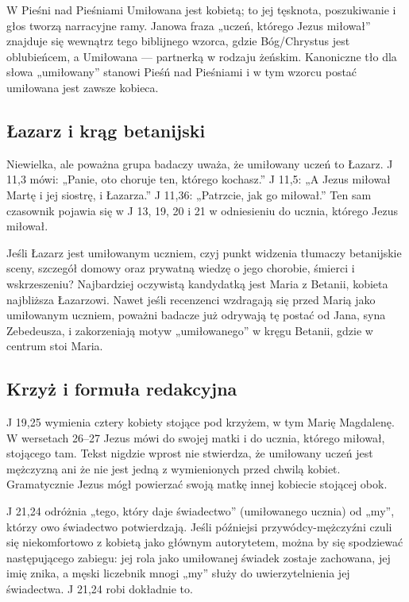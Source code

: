 W Pieśni nad Pieśniami Umiłowana jest kobietą; to jej tęsknota, poszukiwanie i głos tworzą narracyjne ramy.
Janowa fraza „uczeń, którego Jezus miłował” znajduje się wewnątrz tego biblijnego wzorca, gdzie Bóg/Chrystus jest oblubieńcem, a Umiłowana — partnerką w rodzaju żeńskim.
Kanoniczne tło dla słowa „umiłowany” stanowi Pieśń nad Pieśniami i w tym wzorcu postać umiłowana jest zawsze kobieca.

\subsection{Łazarz i krąg betanijski}\label{subsec:lazarus-bethany}

Niewielka, ale poważna grupa badaczy uważa, że umiłowany uczeń to Łazarz.
J 11,3 mówi: „Panie, oto choruje ten, którego kochasz.”
J 11,5: „A Jezus miłował Martę i jej siostrę, i Łazarza.”
J 11,36: „Patrzcie, jak go miłował.”
Ten sam czasownik pojawia się w J 13, 19, 20 i 21 w odniesieniu do ucznia, którego Jezus miłował.

Jeśli Łazarz jest umiłowanym uczniem, czyj punkt widzenia tłumaczy betanijskie sceny, szczegół domowy oraz prywatną wiedzę o jego chorobie, śmierci i wskrzeszeniu?
Najbardziej oczywistą kandydatką jest Maria z Betanii, kobieta najbliższa Łazarzowi.
Nawet jeśli recenzenci wzdragają się przed Marią jako umiłowanym uczniem, poważni badacze już odrywają tę postać od Jana, syna Zebedeusza, i zakorzeniają motyw „umiłowanego” w kręgu Betanii, gdzie w centrum stoi Maria.

\subsection{Krzyż i formuła redakcyjna}\label{subsec:cross-editorial-formula}

J 19,25 wymienia cztery kobiety stojące pod krzyżem, w tym Marię Magdalenę.
W wersetach 26--27 Jezus mówi do swojej matki i do ucznia, którego miłował, stojącego tam.
Tekst nigdzie wprost nie stwierdza, że umiłowany uczeń jest mężczyzną ani że nie jest jedną z wymienionych przed chwilą kobiet.
Gramatycznie Jezus mógł powierzać swoją matkę innej kobiecie stojącej obok.

J 21,24 odróżnia „tego, który daje świadectwo” (umiłowanego ucznia) od „my”, którzy owo świadectwo potwierdzają.
Jeśli późniejsi przywódcy-mężczyźni czuli się niekomfortowo z kobietą jako głównym autorytetem, można by się spodziewać następującego zabiegu:
jej rola jako umiłowanej świadek zostaje zachowana, jej imię znika, a męski liczebnik mnogi „my” służy do uwierzytelnienia jej świadectwa.
J 21,24 robi dokładnie to.

